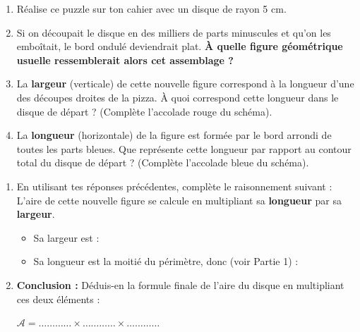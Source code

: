 \documentclass[a4paper]{book}
\begin{document}
\begin{exercice}
        \begin{enumerate}
            \item Réalise ce puzzle sur ton cahier avec un disque de rayon 5 cm.
            
            \item Si on découpait le disque en des milliers de parts minuscules et qu'on les emboîtait, le bord ondulé deviendrait plat. \textbf{À quelle figure géométrique usuelle ressemblerait alors cet assemblage ?} \newline
            
            \item La \textbf{largeur} (verticale) de cette nouvelle figure correspond à la longueur d'une des découpes droites de la pizza. À quoi correspond cette longueur dans le disque de départ ? (Complète l'accolade rouge du schéma). \newline
        
            \item La \textbf{longueur} (horizontale) de la figure est formée par le bord arrondi de toutes les parts bleues. Que représente cette longueur par rapport au contour total du disque de départ ? (Complète l'accolade bleue du schéma). \newline
        \end{enumerate}
    \end{exercice}


    \begin{exercice}
        
        \begin{enumerate}
            \item En utilisant tes réponses précédentes, complète le raisonnement suivant : \\
            L'aire de cette nouvelle figure se calcule en multipliant sa \textbf{longueur} par sa \textbf{largeur}. \\
            \begin{itemize}
                \item Sa largeur est : \points[4]
                \item Sa longueur est la moitié du périmètre, donc (voir Partie 1) : \points[4]
            \end{itemize}
            
            \vspace{0.2cm}
            \item \textbf{Conclusion :} Déduis-en la formule finale de l'aire du disque en multipliant ces deux éléments : \\
            \vspace{0.2cm}
            \begin{center}
                \Large $\mathcal{A} = \dots\dots\dots\dots \times \dots\dots\dots\dots \times \dots\dots\dots\dots$
            \end{center}
        \end{enumerate}
    \end{exercice}
\end{document}
